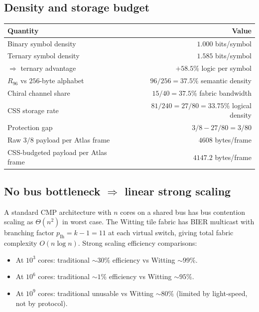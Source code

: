 \documentclass[11pt,letterpaper]{article}
\theoremstyle{remark}
\begin{document}
\subsection{Density and storage budget}

\begin{center}
\renewcommand{\arraystretch}{1.18}
\begin{tabular}{lr}
\toprule
\textbf{Quantity} & \textbf{Value} \\
\midrule
Binary symbol density       & $1.000$ bits/symbol \\
Ternary symbol density      & $1.585$ bits/symbol \\
$\Rightarrow$ ternary advantage          & $+58.5\%$ logic per symbol \\
\midrule
$R_{96}$ vs $256$-byte alphabet & $96/256 = 37.5\%$ semantic density \\
Chiral channel share          & $15/40 = 37.5\%$ fabric bandwidth \\
CSS storage rate              & $81/240 = 27/80 = 33.75\%$ logical density \\
Protection gap                & $3/8 - 27/80 = 3/80$ \\
\midrule
Raw $3/8$ payload per Atlas frame & $4608$ bytes/frame \\
CSS-budgeted payload per Atlas frame & $4147.2$ bytes/frame \\
\bottomrule
\end{tabular}
\end{center}

\subsection{\texorpdfstring{No bus bottleneck $\Rightarrow$ linear strong scaling}{No bus bottleneck implies linear strong scaling}}

A standard CMP architecture with $n$ cores on a shared bus has bus contention scaling as
$\Theta(n^2)$ in worst case. The Witting tile fabric has BIER multicast with branching
factor $p_{\mathrm{Ih}} = k - 1 = 11$ at each virtual switch, giving total fabric
complexity $O(n \log n)$. Strong scaling efficiency comparisons:
\begin{itemize}[leftmargin=2em,nosep]
\item At $10^3$ cores: traditional $\sim 30\%$ efficiency vs Witting $\sim 99\%$.
\item At $10^6$ cores: traditional $\sim 1\%$ efficiency vs Witting $\sim 95\%$.
\item At $10^9$ cores: traditional unusable vs Witting $\sim 80\%$ (limited by
light-speed, not by protocol).
\end{itemize}
\end{document}

